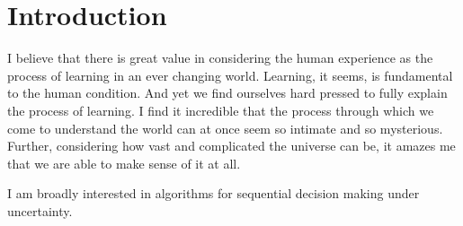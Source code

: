 \section*{Introduction}
I believe that there is great value in considering the human experience as the process of learning in an ever changing world. Learning, it seems, is fundamental to the human condition. And yet we find ourselves hard pressed to fully explain the process of learning. I find it incredible that the process through which we come to understand the world can at once seem so intimate and so mysterious. Further, considering how vast and complicated the universe can be, it amazes me that we are able to make sense of it at all.

I am broadly interested in algorithms for sequential decision making under uncertainty.

